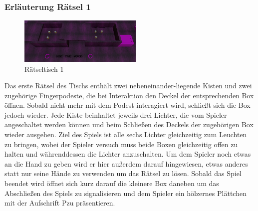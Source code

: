 \subsubsection{Erläuterung Rätsel 1}
\begin{figure}
	\vspace*{-0.5cm}
	\includegraphics[width=5.9cm]{Pictures/Tisch1}
	\caption{Rätseltisch 1}
	\vspace*{-0.5cm}
	\label{fig:tisch1}
\end{figure}
Das erste Rätsel des Tischs enthält zwei nebeneinander-liegende Kisten und zwei zugehörige Fingerpodeste, die bei Interaktion den Deckel der entsprechenden Box öffnen. Sobald nicht mehr mit dem Podest interagiert wird, schließt sich die Box jedoch wieder. Jede Kiste beinhaltet jeweils drei Lichter, die vom Spieler angeschaltet werden können und beim Schließen des Deckels der zugehörigen Box wieder ausgehen. Ziel des Spiels ist alle sechs Lichter gleichzeitig zum Leuchten zu bringen, wobei der Spieler versuch muss beide Boxen gleichzeitig offen zu halten und währenddessen die Lichter anzuschalten. Um dem Spieler noch etwas an die Hand zu geben wird er hier außerdem darauf hingewiesen, etwas anderes statt nur seine Hände zu verwenden um das Rätsel zu lösen. Sobald das Spiel beendet wird öffnet sich kurz darauf die kleinere Box daneben um das Abschließen des Spiels zu signalisieren und dem Spieler ein hölzernes Plättchen mit der Aufschrift \dq P\dq zu präsentieren.\\

